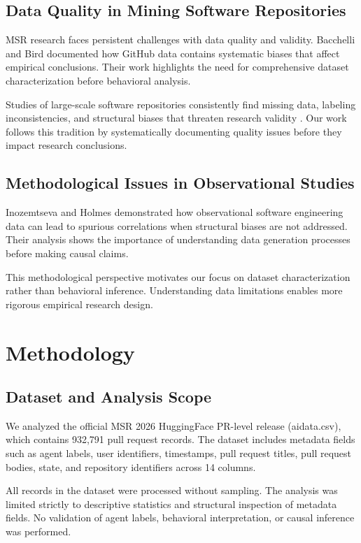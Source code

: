 \documentclass[conference]{IEEEtran}
\begin{document}
\subsection{Data Quality in Mining Software Repositories}

MSR research faces persistent challenges with data quality and validity. Bacchelli and Bird \cite{bacchelli2013expectations} documented how GitHub data contains systematic biases that affect empirical conclusions. Their work highlights the need for comprehensive dataset characterization before behavioral analysis.

Studies of large-scale software repositories consistently find missing data, labeling inconsistencies, and structural biases that threaten research validity \cite{niu2022role}. Our work follows this tradition by systematically documenting quality issues before they impact research conclusions.

\subsection{Methodological Issues in Observational Studies}

Inozemtseva and Holmes \cite{inozemtseva2014coverage} demonstrated how observational software engineering data can lead to spurious correlations when structural biases are not addressed. Their analysis shows the importance of understanding data generation processes before making causal claims.

This methodological perspective motivates our focus on dataset characterization rather than behavioral inference. Understanding data limitations enables more rigorous empirical research design.

\section{Methodology}

\subsection{Dataset and Analysis Scope}

We analyzed the official MSR 2026 HuggingFace PR-level release (aidata.csv), which contains 932,791 pull request records. The dataset includes metadata fields such as agent labels, user identifiers, timestamps, pull request titles, pull request bodies, state, and repository identifiers across 14 columns.

All records in the dataset were processed without sampling. The analysis was limited strictly to descriptive statistics and structural inspection of metadata fields. No validation of agent labels, behavioral interpretation, or causal inference was performed.
\end{document}
